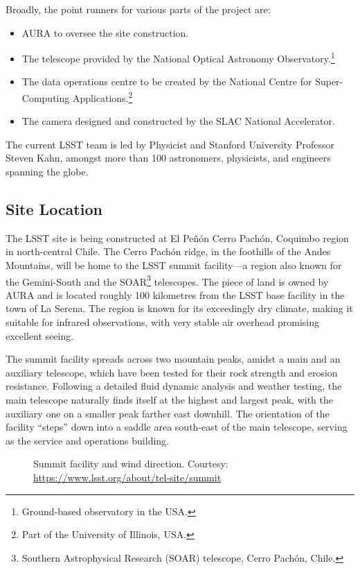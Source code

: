 \documentclass[12pt,a4paper]{article}
\begin{document}
Broadly, the point runners for various parts of the project are:

\begin{itemize}[leftmargin=*]
  \item AURA to oversee the site construction.
  \item The telescope provided by the National Optical Astronomy
        Observatory.\footnote{Ground-based observatory in the USA.}
  \item The data operations centre to be created by the National Centre for
        Super-Computing Applications.\footnote{Part of the University of
        Illinois, USA.}
  \item The camera designed and constructed by the SLAC National Accelerator.
\end{itemize}

The current LSST team is led by Physicist and Stanford University Professor
Steven Kahn, amongst more than 100 astronomers, physicists, and engineers
spanning the globe.

\subsection{Site Location}

The LSST site is being constructed at El Pe\~{n}\'{o}n Cerro Pach\'{o}n,
Coquimbo region in north-central Chile. The Cerro Pach\'{o}n ridge, in the
foothills of the Andes Mountains, will be home to the LSST summit facility---a
region also known for the Gemini-South and the SOAR\footnote{Southern
Astrophysical Research (SOAR) telescope, Cerro Pach\'{o}n, Chile.}
telescopes. The piece of land is owned by AURA and is located roughly 100
kilometres from the LSST base facility in the town of La Serena. The region is
known for its exceedingly dry climate, making it suitable for infrared
observations, with very stable air overhead promising excellent seeing.

The summit facility spreads across two mountain peaks, amidst a main and an
auxiliary telescope, which have been tested for their rock strength and erosion
resistance. Following a detailed fluid dynamic analysis and weather testing, the
main telescope naturally finds itself at the highest and largest peak, with the
auxiliary one on a smaller peak farther east downhill. The orientation of the
facility ``steps'' down into a saddle area south-east of the main telescope,
serving as the service and operations building.

\begin{figure}[htbp]
  \centering
  \caption{Summit facility and wind direction.
           Courtesy: \url{https://www.lsst.org/about/tel-site/summit}}
  \label{fig:summit}
\end{figure}
\end{document}
